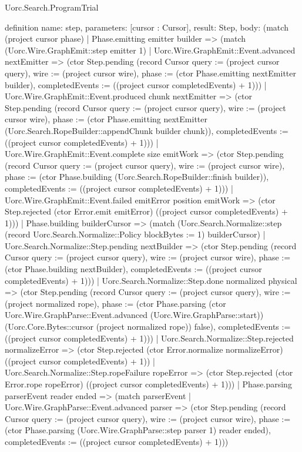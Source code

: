 \begin{lexlean}{Uorc.Search.ProgramTrial}
\begin{semanticmodule}
definition{
  name: step,
  parameters: [cursor : Cursor],
  result: Step,
  body: (match (project cursor phase)
    | Phase.emitting emitter builder => (match (Uorc.Wire.GraphEmit::step emitter 1)
      | Uorc.Wire.GraphEmit::Event.advanced nextEmitter => (ctor Step.pending (record Cursor {query := (project cursor query), wire := (project cursor wire), phase := (ctor Phase.emitting nextEmitter builder), completedEvents := ((project cursor completedEvents) + 1)}))
      | Uorc.Wire.GraphEmit::Event.produced chunk nextEmitter => (ctor Step.pending (record Cursor {query := (project cursor query), wire := (project cursor wire), phase := (ctor Phase.emitting nextEmitter (Uorc.Search.RopeBuilder::appendChunk builder chunk)), completedEvents := ((project cursor completedEvents) + 1)}))
      | Uorc.Wire.GraphEmit::Event.complete size emitWork => (ctor Step.pending (record Cursor {query := (project cursor query), wire := (project cursor wire), phase := (ctor Phase.building (Uorc.Search.RopeBuilder::finish builder)), completedEvents := ((project cursor completedEvents) + 1)}))
      | Uorc.Wire.GraphEmit::Event.failed emitError position emitWork => (ctor Step.rejected (ctor Error.emit emitError) ((project cursor completedEvents) + 1)))
    | Phase.building builderCursor => (match (Uorc.Search.Normalize::step (record Uorc.Search.Normalize::Policy {blockBytes := 1}) builderCursor)
      | Uorc.Search.Normalize::Step.pending nextBuilder => (ctor Step.pending (record Cursor {query := (project cursor query), wire := (project cursor wire), phase := (ctor Phase.building nextBuilder), completedEvents := ((project cursor completedEvents) + 1)}))
      | Uorc.Search.Normalize::Step.done normalized physical => (ctor Step.pending (record Cursor {query := (project cursor query), wire := (project normalized rope), phase := (ctor Phase.parsing (ctor Uorc.Wire.GraphParse::Event.advanced (Uorc.Wire.GraphParse::start)) (Uorc.Core.Bytes::cursor (project normalized rope)) false), completedEvents := ((project cursor completedEvents) + 1)}))
      | Uorc.Search.Normalize::Step.rejected normalizeError => (ctor Step.rejected (ctor Error.normalize normalizeError) ((project cursor completedEvents) + 1))
      | Uorc.Search.Normalize::Step.ropeFailure ropeError => (ctor Step.rejected (ctor Error.rope ropeError) ((project cursor completedEvents) + 1)))
    | Phase.parsing parserEvent reader ended => (match parserEvent
      | Uorc.Wire.GraphParse::Event.advanced parser => (ctor Step.pending (record Cursor {query := (project cursor query), wire := (project cursor wire), phase := (ctor Phase.parsing (Uorc.Wire.GraphParse::step parser 1) reader ended), completedEvents := ((project cursor completedEvents) + 1)}))
}
\end{semanticmodule}
\end{lexlean}

